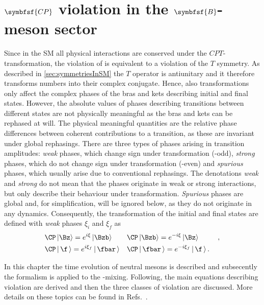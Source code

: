 \chapter[head={\CP violation in the $B$-meson sector},tocentry={$\symbfsf{C{}P}$ violation in the $\symbfsf{B}$-meson sector}]
{$\symbfsf{C{}P}$ violation in the $\symbfsf{B}$-meson sector}
\label{chap:CPV}

Since in the \ac{SM} all physical interactions are conserved under the $CPT$-transformation, the violation of \CP is equivalent to a violation of the $T$ symmetry.
As described in \cref{sec:symmetriesInSM} the $T$ operator is antiunitary and it therefore transforms numbers into their complex conjugate.
Hence, also \CP transformations only affect the complex phases of the bras and kets describing initial and final states.
However, the absolute values of phases describing transitions between different states are not physically meaningful as the bras and kets can be rephased at will.
The physical meaningful quantities are the relative phase differences between coherent contributions to a transition, as these are invariant under global rephasings.
There are three types of phases arising in transition amplitudes:
\emph{weak} phases, which change sign under \CP transformation (\CP-odd), \emph{strong} phases, which do not change sign under \CP transformation (\CP-even) and \emph{spurious} phases, which usually arise due to conventional rephasings.
The denotations \emph{weak} and \emph{strong} do not mean that the phases originate in weak or strong interactions, but only describe their behaviour under \CP transformation.
\emph{Spurious} phases are global and, for simplification, will be ignored below, as they do not originate in any dynamics.
Consequently, the \CP transformation of the initial and final states are defined with \emph{weak} phases $\xi_i$ and $\xi_f$ as
\begin{equation}
\begin{aligned}
&\CP\left|\Bz\right> =e^{i\xi}\left|\Bzb\right>&&\CP\left|\Bzb\right>=e^{-i\xi}\left|\Bz\right>&\,,\\
&\CP\left|\,\f\,\right> =e^{i\xi_f}\left|\,\fbar\,\right>&&\CP\left|\,\fbar\,\right>=e^{-i\xi_f}\left|\,\f\,\right>.& \label{eq:CPTransInitFinal}
\end{aligned}
\end{equation}

In this chapter the time evolution of neutral mesons is described and subsecently the formalism is applied to the \Bz-\Bzb mixing.
Following, the main equations describing \CP violation are derived and then the three classes of \CP violation are discussed.
More details on these topics can be found in Refs.~\cite{Branco:396964,Bigi:1295518}.

